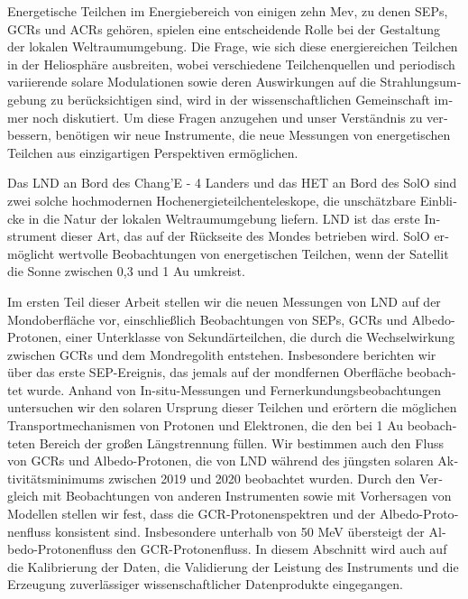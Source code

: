 \begin{otherlanguage}{ngerman}
    Energetische Teilchen im Energiebereich von einigen zehn Mev, zu denen \acp{SEP}, \acp{GCR} und \acp{ACR} gehören, spielen eine entscheidende Rolle bei der Gestaltung der lokalen Weltraumumgebung. Die Frage, wie sich diese energiereichen Teilchen in der Heliosphäre ausbreiten, wobei verschiedene Teilchenquellen und periodisch variierende solare Modulationen sowie deren Auswirkungen auf die Strahlungsumgebung zu berücksichtigen sind, wird in der wissenschaftlichen Gemeinschaft immer noch diskutiert. Um diese Fragen anzugehen und unser Verständnis zu verbessern, benötigen wir neue Instrumente, die neue Messungen von energetischen Teilchen aus einzigartigen Perspektiven ermöglichen.

    Das \ac{LND} an Bord des Chang'E - 4 Landers und das \ac{HET} an Bord des \ac{SolO} sind zwei solche hochmodernen Hochenergieteilchenteleskope, die unschätzbare Einblicke in die Natur der lokalen Weltraumumgebung liefern. \ac{LND} ist das erste Instrument dieser Art, das auf der Rückseite des Mondes betrieben wird. \ac{SolO} ermöglicht wertvolle Beobachtungen von energetischen Teilchen, wenn der Satellit die Sonne zwischen 0,3 und 1 Au umkreist.
    
    Im ersten Teil dieser Arbeit stellen wir die neuen Messungen von \ac{LND} auf der Mondoberfläche vor, einschließlich Beobachtungen von \acp{SEP}, \acp{GCR} und Albedo-Protonen, einer Unterklasse von Sekundärteilchen, die durch die Wechselwirkung zwischen \acp{GCR} und dem Mondregolith entstehen. Insbesondere berichten wir über das erste \ac{SEP}-Ereignis, das jemals auf der mondfernen Oberfläche beobachtet wurde. Anhand von In-situ-Messungen und Fernerkundungsbeobachtungen untersuchen wir den solaren Ursprung dieser Teilchen und erörtern die möglichen Transportmechanismen von Protonen und Elektronen, die den bei 1 Au beobachteten Bereich der großen Längstrennung füllen. Wir bestimmen auch den Fluss von \acp{GCR} und Albedo-Protonen, die von \ac{LND} während des jüngsten solaren Aktivitätsminimums zwischen 2019 und 2020 beobachtet wurden. Durch den Vergleich mit Beobachtungen von anderen Instrumenten sowie mit Vorhersagen von Modellen stellen wir fest, dass die \ac{GCR}-Protonenspektren und der Albedo-Protonenfluss konsistent sind. Insbesondere unterhalb von 50 MeV übersteigt der Albedo-Protonenfluss den \ac{GCR}-Protonenfluss.
    In diesem Abschnitt wird auch auf die Kalibrierung der Daten, die Validierung der Leistung des Instruments und die Erzeugung zuverlässiger wissenschaftlicher Datenprodukte eingegangen.
    

\end{otherlanguage}
